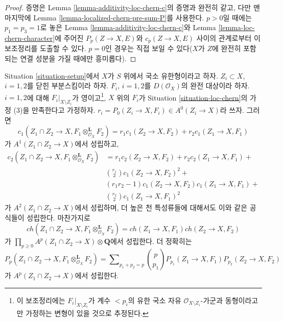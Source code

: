 \begin{proof}
증명은 Lemma \ref{lemma-additivity-loc-chern-c}의 증명과 완전히 같고,
다만 맨 마지막에 Lemma \ref{lemma-localized-chern-pre-sum-P}를
사용한다. $p > 0$일 때에는 $p_1 = p_3 = 1$로 놓은
Lemma \ref{lemma-additivity-loc-chern-c}와 Lemma
\ref{lemma-loc-chern-character}에 주어진 $P_p(Z \to X, E)$와
$c_p(Z \to X, E)$ 사이의 관계로부터 이 보조정리를 도출할 수 있다.
$p = 0$인 경우는 직접 보일 수 있다($X$가 $Z$에 완전히 포함되는
연결 성분을 가질 때에만 흥미롭다).
\end{proof}

\begin{lemma}
\label{lemma-loc-chern-tensor-product}
Situation \ref{situation-setup}에서 $X$가 $S$ 위에서 국소 유한형이라고
하자. $Z_i \subset X$, $i = 1, 2$를 닫힌 부분스킴이라 하자.
$F_i$, $i = 1, 2$를 $D(\mathcal{O}_X)$의 완전 대상이라 하자.
$i = 1, 2$에 대해 $F_i|_{X \setminus Z_i}$가 영이고\footnote{이 보조정리에는
$F_i|_{X \setminus Z_i}$가 계수 $< p_i$의 유한 국소 자유
$\mathcal{O}_{X \setminus Z_i}$-가군과 동형이라고만 가정하는 변형이
있을 것으로 추정된다.}, $X$ 위의 $F_i$가 Situation
\ref{situation-loc-chern}의 가정 (3)을 만족한다고 가정하자.
$r_i = P_0(Z_i \to X, F_i) \in A^0(Z_i \to X)$라 쓰자. 그러면
$$
c_1(Z_1 \cap Z_2 \to X, F_1 \otimes_{\mathcal{O}_X}^\mathbf{L} F_2) =
r_1 c_1(Z_2 \to X, F_2) + r_2 c_1(Z_1 \to X, F_1)
$$
가 $A^1(Z_1 \cap Z_2 \to X)$에서 성립하고,
\begin{align*}
c_2(Z_1 \cap Z_2 \to X, F_1 \otimes_{\mathcal{O}_X}^\mathbf{L} F_2)
& =
r_1 c_2(Z_2 \to X, F_2) +
r_2 c_2(Z_1 \to X, F_1) + \\
& {r_1 \choose 2} c_1(Z_2 \to X, F_2)^2 + \\
& (r_1r_2 - 1) c_1(Z_2 \to X, F_2)c_1(Z_1 \to X, F_1) + \\
& {r_2 \choose 2} c_1(Z_1 \to X, F_1)^2
\end{align*}
가 $A^2(Z_1 \cap Z_2 \to X)$에서 성립하며, 더 높은 천 특성류들에
대해서도 이와 같은 공식들이 성립한다. 마찬가지로
$$
ch(Z_1 \cap Z_2 \to X, F_1 \otimes_{\mathcal{O}_X}^\mathbf{L} F_2) =
ch(Z_1 \to X, F_1) ch(Z_2 \to X, F_2)
$$
가 $\prod_{p \geq 0} A^p(Z_1 \cap Z_2 \to X) \otimes \mathbf{Q}$에서
성립한다. 더 정확히는
$$
P_p(Z_1 \cap Z_2 \to X, F_1 \otimes_{\mathcal{O}_X}^\mathbf{L} F_2) =
\sum\nolimits_{p_1 + p_2 = p}
{p \choose p_1} P_{p_1}(Z_1 \to X, F_1) P_{p_2}(Z_2 \to X, F_2)
$$
가 $A^p(Z_1 \cap Z_2 \to X)$에서 성립한다.
\end{lemma}

